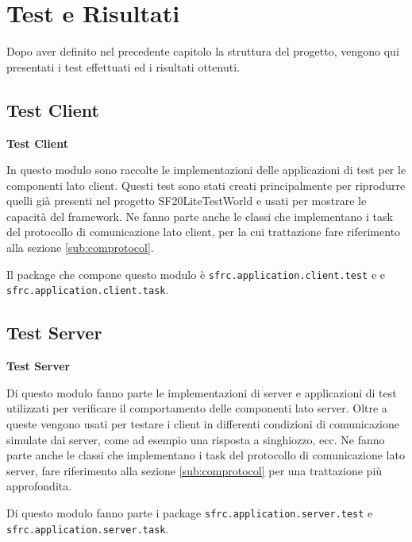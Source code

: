 
\chapter{Test e Risultati}
\label{ch:testerisultati}
Dopo aver definito nel precedente capitolo la struttura del progetto, vengono qui presentati i test effettuati ed i risultati ottenuti.


\section{Test Client}
\label{sec:tclientmodule}

\textbf{Test Client}

In questo modulo sono raccolte le implementazioni delle applicazioni di test per le componenti lato client. Questi test sono stati creati principalmente per riprodurre quelli gi\`a presenti nel progetto %
SF20LiteTestWorld e usati per mostrare le capacit\`a del framework.
Ne fanno parte anche le classi che implementano i task del protocollo di comunicazione lato client, per la cui trattazione fare riferimento alla sezione \ref{sub:comprotocol}.

Il package che compone questo modulo \`e \texttt{sfrc.application.client.test} e e \texttt{sfrc.application.client.task}.



\section{Test Server}
\label{sec:tservermodule}

\textbf{Test Server}

Di questo modulo fanno parte le implementazioni di server e applicazioni di test utilizzati per verificare il comportamento delle componenti lato server. Oltre a queste vengono usati per testare i client in differenti condizioni di comunicazione simulate dai server, come ad esempio una risposta a singhiozzo, ecc.
Ne fanno parte anche le classi che implementano i task del protocollo di comunicazione lato server, fare riferimento alla sezione \ref{sub:comprotocol} per una trattazione pi\`u approfondita.

Di questo modulo fanno parte i package \texttt{sfrc.application.server.test} e \texttt{sfrc.application.server.task}.



